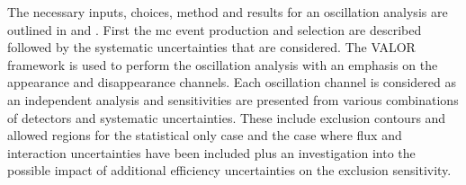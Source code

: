 The necessary inputs, choices, method and results for an oscillation analysis are outlined in  and . First the \gls{mc} event production and selection are described followed by the systematic uncertainties that are considered. The VALOR framework is used to perform the oscillation analysis with an emphasis on the \nue appearance and \nue disappearance channels. Each oscillation channel is considered as an independent analysis and sensitivities are presented from various combinations of detectors and systematic uncertainties. These include exclusion contours and allowed regions for the statistical only case and the case where flux and interaction uncertainties have been included plus an investigation into the possible impact of additional efficiency uncertainties on the exclusion sensitivity. 